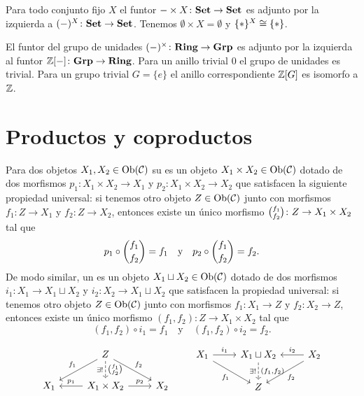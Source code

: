 \documentclass{article}
\numberwithin{equation}{section}
\theoremstyle{definition}
\begin{document}
\begin{ejemplo}
  Para todo conjunto fijo $X$ el funtor
  $-\times X\colon \text{\bf Set}\to \text{\bf Set}$ es adjunto por la izquierda a
  $(-)^X\colon \text{\bf Set}\to \text{\bf Set}$. Tenemos
  $\emptyset \times X = \emptyset$ y $\{ \ast \}^X \cong \{ \ast \}$.
\end{ejemplo}

\begin{ejemplo}
  El funtor del grupo de unidades $(-)^\times\colon \text{\bf Ring}\to \text{\bf Grp}$
  es adjunto por la izquierda al funtor
  ${\mathbb{Z} [-]\colon \text{\bf Grp} \to \text{\bf Ring}}$. Para un anillo trivial $0$ el
  grupo de unidades es trivial. Para un grupo trivial $G = \{ e \}$ el anillo
  correspondiente $\mathbb{Z} [G]$ es isomorfo a $\mathbb{Z}$.
\end{ejemplo}


\section{Productos y coproductos}

\begin{definicion}
  Para dos objetos $X_1, X_2\in \operatorname{Ob} (\mathcal{C})$ su  es un
  objeto $X_1\times X_2\in \operatorname{Ob} (\mathcal{C})$ dotado de dos morfismos
  $p_1\colon X_1\times X_2\to X_1$ y $p_2\colon X_1\times X_2 \to X_2$ que
  satisfacen la siguiente propiedad universal: si tenemos otro objeto
  $Z \in \operatorname{Ob} (\mathcal{C})$ junto con morfismos $f_1 \colon Z\to X_1$ y
  $f_2\colon Z\to X_2$, entonces existe un único morfismo
  ${f_1 \choose f_2}\colon Z\to X_1\times X_2$ tal que
  $$p_1\circ {f_1 \choose f_2} = f_1 \quad\text{y}\quad p_2\circ {f_1 \choose f_2} = f_2.$$
  De modo similar, un  es un objeto
  $X_1\sqcup X_2\in \operatorname{Ob} (\mathcal{C})$ dotado de dos morfismos
  $i_1\colon X_1\to X_1\sqcup X_2$ y $i_2\colon X_2\to X_1\sqcup X_2$ que
  satisfacen la propiedad universal: si tenemos otro objeto
  $Z \in \operatorname{Ob} (\mathcal{C})$ junto con morfismos $f_1\colon X_1\to Z$ y
  $f_2\colon X_2\to Z$, entonces existe un único morfismo
  $(f_1,f_2)\colon Z\to X_1\times X_2$ tal que
  $$(f_1,f_2)\circ i_1 = f_1 \quad\text{y}\quad (f_1,f_2)\circ i_2 = f_2.$$

  \[ \begin{tikzcd}
      & Z\ar[dashed]{d}{\tcol{f_1}{f_2}}[swap]{\exists !}\ar{dl}[swap]{f_1}\ar{dr}{f_2} \\
      X_1 & X_1\times X_2\ar{l}[swap]{p_1}\ar{r}{p_2} & X_2
    \end{tikzcd} \quad\quad
    \begin{tikzcd}
      X_1\ar{r}{i_1}\ar{dr}[swap]{f_1} & X_1\sqcup X_2\ar[dashed]{d}[swap]{\exists !}{(f_1,f_2)} & X_2\ar{l}[swap]{i_2}\ar{dl}{f_2} \\
      & Z
    \end{tikzcd} \]
\end{definicion}
\end{document}
